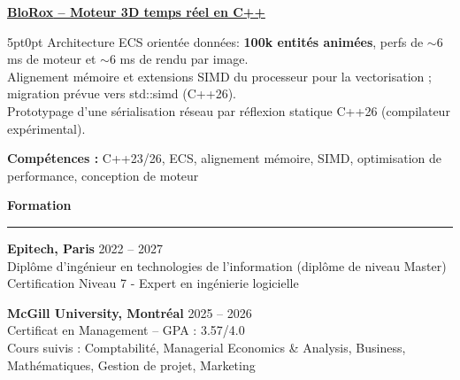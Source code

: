 \documentclass[9pt]{extarticle}
\begin{document}
\par\vspace{8pt}

\underline{\bfseries \href{https://github.com/paulogarithm/blorox}{BloRox} -- Moteur 3D temps réel en C++}
\par
\begin{adjustwidth}{5pt}{0pt}
	Architecture ECS orientée données: {\bfseries 100k entités animées}, perfs de $\sim$6 ms de moteur et $\sim$6 ms de rendu par image. \\
	Alignement mémoire et extensions SIMD du processeur pour la vectorisation ; migration prévue vers {\ttfamily std::simd} (C++26). \\
	Prototypage d'une sérialisation réseau par réflexion statique C++26 (compilateur expérimental).
\end{adjustwidth}
\par
{\bfseries Compétences :} C++23/26, ECS, alignement mémoire, SIMD, optimisation de performance, conception de moteur
\par\vspace{8pt}

{\large\bfseries Formation}
\par\vspace{-8pt}
\rule{\linewidth}{0.4pt}
\par\vspace{5pt}

{\bfseries Epitech, Paris} \hfill 2022 -- 2027 \\
Diplôme d'ingénieur en technologies de l'information (diplôme de niveau Master) \\
Certification Niveau 7 - Expert en ingénierie logicielle

\vspace{6pt}

{\bfseries McGill University, Montréal} \hfill 2025 -- 2026 \\
Certificat en Management -- GPA : 3.57/4.0 \\
Cours suivis : Comptabilité, Managerial Economics \& Analysis, Business, Mathématiques, Gestion de projet, Marketing
\end{document}
